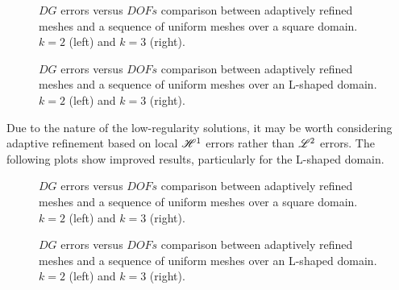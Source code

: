 \begin{figure}[!ht]
	\begin{subfigure}[b]{0.45\textwidth}
		
	\end{subfigure}
	\hfill
	\begin{subfigure}[b]{0.45\textwidth}
		
	\end{subfigure}
    \caption{$DG$ errors versus $DOFs$ comparison between adaptively refined meshes and a sequence of uniform meshes over a square domain. $k = 2$ (left) and $k = 3$ (right).}
\end{figure}

\begin{figure}[!ht]
	\begin{subfigure}[b]{0.45\textwidth}
		
	\end{subfigure}
	\hfill
	\begin{subfigure}[b]{0.45\textwidth}
		
	\end{subfigure}
    \caption{$DG$ errors versus $DOFs$ comparison between adaptively refined meshes and a sequence of uniform meshes over an L-shaped domain. $k = 2$ (left) and $k = 3$ (right).}
\end{figure}

\newpage

Due to the nature of the low-regularity solutions, it may be worth considering adaptive refinement based on local $\mathscr{H}^1$ errors rather than $\mathscr{L}^2$ errors. The following plots show improved results, particularly for the L-shaped domain.

\begin{figure}[!ht]
	\begin{subfigure}[b]{0.45\textwidth}
		
	\end{subfigure}
	\hfill
	\begin{subfigure}[b]{0.45\textwidth}
		
	\end{subfigure}
    \caption{$DG$ errors versus $DOFs$ comparison between adaptively refined meshes and a sequence of uniform meshes over a square domain. $k = 2$ (left) and $k = 3$ (right).}
\end{figure}

\begin{figure}[!ht]
	\begin{subfigure}[b]{0.45\textwidth}
		
	\end{subfigure}
	\hfill
	\begin{subfigure}[b]{0.45\textwidth}
	\end{subfigure}
    \caption{$DG$ errors versus $DOFs$ comparison between adaptively refined meshes and a sequence of uniform meshes over an L-shaped domain. $k = 2$ (left) and $k = 3$ (right).}
\end{figure}

